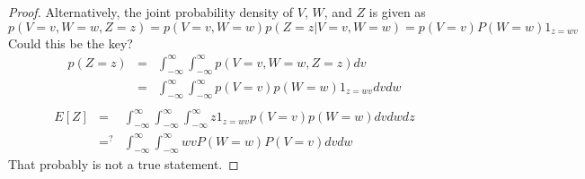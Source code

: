 \documentclass[11pt]{article}
\begin{document}
\begin{proof}
    Alternatively, the joint probability density of $V$, $W$, and $Z$ is given as
    \begin{equation}
        p(V=v, W=w, Z=z) = p(V=v, W=w)p(Z=z|V=v,W=w) = p(V=v)P(W=w)1_{z=wv}
    \end{equation}
    Could this be the key?
    \begin{eqnarray}
        p(Z=z) &=& \int_{-\infty}^{\infty} \int_{-\infty}^{\infty} p(V=v, W=w, Z=z)dv \\
        &=& \int_{-\infty}^{\infty} \int_{-\infty}^{\infty} p(V=v) p(W=w)1_{z=wv} dv dw \\
    \end{eqnarray}
    \begin{eqnarray}
        E[Z] &=& \int_{-\infty}^{\infty} \int_{-\infty}^{\infty} \int_{-\infty}^{\infty}
            z 1_{z=wv} p(V=v)p(W=w) dv dw dz \\
            &=^?& \int_{-\infty}^{\infty} \int_{-\infty}^{\infty} wvP(W=w)P(V=v) dv dw
    \end{eqnarray}
    That probably is not a true statement.
\end{proof}

%
%

\end{document}
